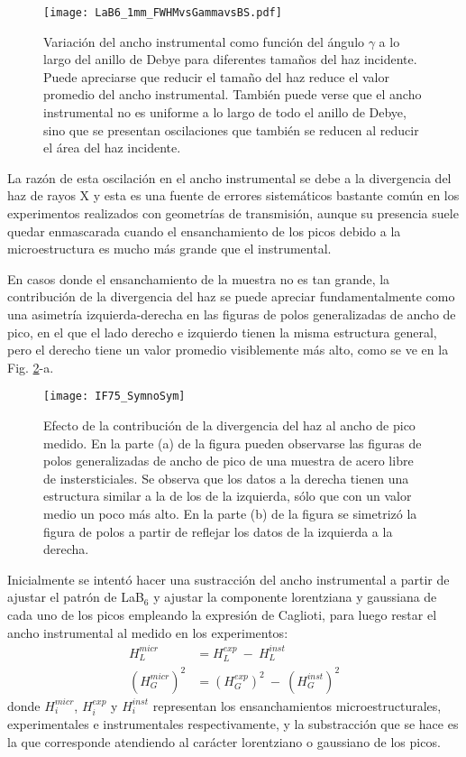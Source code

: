 \begin{figure}[!htb]
  \centering
  \texttt{[image: LaB6\_1mm\_FWHMvsGammavsBS.pdf]}
  \caption{Variación del ancho instrumental como función del ángulo $\gamma$ a lo largo del anillo de Debye para diferentes tamaños del haz incidente. Puede apreciarse que reducir el tamaño del haz reduce el valor promedio del ancho instrumental. También puede verse que el ancho instrumental no es uniforme a lo largo de todo el anillo de Debye, sino que se presentan oscilaciones que también se reducen al reducir el área del haz incidente.}
  \label{fig:LaB6vsGamma}
\end{figure}

La razón de esta oscilación en el ancho instrumental se debe a la divergencia del haz de rayos X\cite{Wcislak2002} y esta es una fuente de errores sistemáticos bastante común en los experimentos realizados con geometrías de transmisión, aunque su presencia suele quedar enmascarada cuando el ensanchamiento de los picos debido a la microestructura es mucho más grande que el instrumental.

En casos donde el ensanchamiento de la muestra no es tan grande, la contribución de la divergencia del haz se puede apreciar fundamentalmente como una asimetría izquierda-derecha en las figuras de polos generalizadas de ancho de pico, en el que el lado derecho e izquierdo tienen la misma estructura general, pero el derecho tiene un valor promedio visiblemente más alto, como se ve en la Fig. \ref{fig:IF75NoSym}-a.

\begin{figure}[!htb] 
  \centering
  \texttt{[image: IF75\_SymnoSym]}
  \caption{Efecto de la contribución de la divergencia del haz al ancho de pico medido. En la parte (a) de la figura pueden observarse las figuras de polos generalizadas de ancho de pico de una muestra de acero libre de instersticiales. Se observa que los datos a la derecha tienen una estructura similar a la de los de la izquierda, sólo que con un valor medio un poco más alto. En la parte (b) de la figura se simetrizó la figura de polos a partir de reflejar los datos de la izquierda a la derecha.}
  \label{fig:IF75NoSym}
\end{figure}

Inicialmente se intentó hacer una sustracción del ancho instrumental a partir de ajustar el patrón de LaB$_6$ y ajustar la componente lorentziana y gaussiana de cada uno de los picos empleando la expresión de Caglioti\cite{Caglioti1958}, para luego restar el ancho instrumental al medido en los experimentos:
\begin{align}
  H_L^{micr} & = H_L^{exp} \ - \ H_L^{inst} \nonumber \\
  (H_G^{micr})^2 & = (H_G^{exp})^2 \ - \ (H_G^{inst})^2 
  \label{eq:instrumental}
\end{align}
\noindent
donde $H_i^{micr}$, $H_i^{exp}$ y $H_i^{inst}$ representan los ensanchamientos microestructurales, experimentales e instrumentales respectivamente, y la substracción que se hace es la que corresponde atendiendo al carácter lorentziano o gaussiano de los picos.

